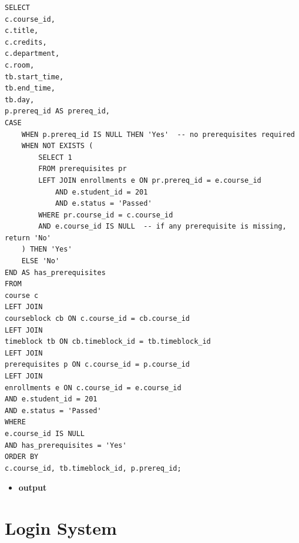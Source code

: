 \documentclass{report}
\makeatletter
\newenvironment{fullcenter}%
    {\@parboxrestore%
    \begin{adjustwidth}{}{\leftmargin}%
    \begin{center}%
    }{\end{center}%
    \end{adjustwidth}%
    }
\newcommand{\usection}[1]{\section*{#1}
\addcontentsline{toc}{section}{\protect\numberline{}#1}}
\makeatother
\begin{document}
\begin{lstlisting}
SELECT
c.course_id,
c.title,
c.credits,
c.department,
c.room,
tb.start_time,
tb.end_time,
tb.day,
p.prereq_id AS prereq_id,
CASE
    WHEN p.prereq_id IS NULL THEN 'Yes'  -- no prerequisites required
    WHEN NOT EXISTS (
        SELECT 1
        FROM prerequisites pr
        LEFT JOIN enrollments e ON pr.prereq_id = e.course_id
            AND e.student_id = 201
            AND e.status = 'Passed'
        WHERE pr.course_id = c.course_id
        AND e.course_id IS NULL  -- if any prerequisite is missing, return 'No'
    ) THEN 'Yes'
    ELSE 'No'
END AS has_prerequisites
FROM 
course c
LEFT JOIN 
courseblock cb ON c.course_id = cb.course_id
LEFT JOIN 
timeblock tb ON cb.timeblock_id = tb.timeblock_id
LEFT JOIN 
prerequisites p ON c.course_id = p.course_id
LEFT JOIN 
enrollments e ON c.course_id = e.course_id
AND e.student_id = 201
AND e.status = 'Passed'
WHERE 
e.course_id IS NULL
AND has_prerequisites = 'Yes'
ORDER BY 
c.course_id, tb.timeblock_id, p.prereq_id;
\end{lstlisting}

\begin{itemize}
    \item \textbf{output}
    \begin{fullcenter}
    \end{fullcenter}
\end{itemize}

\usection{Login System}
\end{document}
